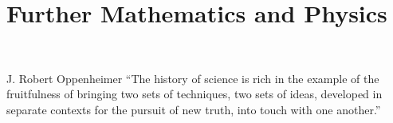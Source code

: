 
\part{Further Mathematics and Physics}\label{part: further math}
\
\begin{chapquote}{J. Robert Oppenheimer}
    ``The history of science is rich in the example of the fruitfulness of bringing two sets of techniques, two sets of ideas, developed in separate contexts for the pursuit of new truth, into touch with one another.''
\end{chapquote}
